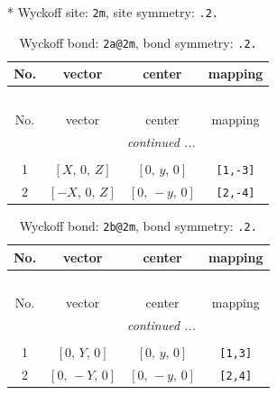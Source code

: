 \documentclass[fleqn,8pt]{jsarticle}
\begin{document}
* Wyckoff site: {\tt 2m}, site symmetry: {\tt .2.}
\renewcommand{\arraystretch}{1.2}
\begin{longtable}{cccc}
\caption{Wyckoff bond: {\tt 2a@2m}, bond symmetry: {\tt .2.}}
 \\
 \hline \hline
No. & vector & center & mapping \\ \hline \endfirsthead

\multicolumn{3}{l}{\tablename\ \thetable{}} \\
 \hline \hline
No. & vector & center & mapping \\ \hline \endhead

 \hline \hline
\multicolumn{3}{r}{\footnotesize\it continued ...} \\ \endfoot

 \hline \hline
\multicolumn{3}{r}{} \\ \endlastfoot

1 & $\left[ X,\, 0,\, Z \right]$ & $\left[ 0,\, y,\, 0 \right]$ & {\tt [1,-3]} \\ \hline
2 & $\left[ - X,\, 0,\, Z \right]$ & $\left[ 0,\, - y,\, 0 \right]$ & {\tt [2,-4]} \\
\end{longtable}
\renewcommand{\arraystretch}{1.2}
\begin{longtable}{cccc}
\caption{Wyckoff bond: {\tt 2b@2m}, bond symmetry: {\tt .2.}}
 \\
 \hline \hline
No. & vector & center & mapping \\ \hline \endfirsthead

\multicolumn{3}{l}{\tablename\ \thetable{}} \\
 \hline \hline
No. & vector & center & mapping \\ \hline \endhead

 \hline \hline
\multicolumn{3}{r}{\footnotesize\it continued ...} \\ \endfoot

 \hline \hline
\multicolumn{3}{r}{} \\ \endlastfoot

1 & $\left[ 0,\, Y,\, 0 \right]$ & $\left[ 0,\, y,\, 0 \right]$ & {\tt [1,3]} \\ \hline
2 & $\left[ 0,\, - Y,\, 0 \right]$ & $\left[ 0,\, - y,\, 0 \right]$ & {\tt [2,4]} \\
\end{longtable}
\renewcommand{\arraystretch}{1.2}
\end{document}
